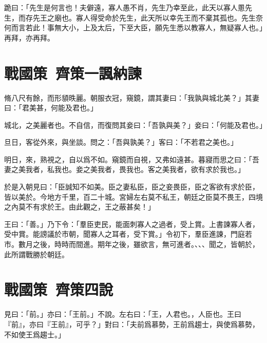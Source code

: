 跪曰：「先生是何言也！夫僻遠，寡人愚不肖，先生乃幸至此，此天以寡人慁先生，而存先王之廟也。寡人得受命於先生，此天所以幸先王而不棄其孤也。先生奈何而言若此！事無大小，上及太后，下至大臣，願先生悉以教寡人，無疑寡人也。」再拜，亦再拜。

\theendnotes

\section[鄒忌諷齊王納諫\quad{\small 戰國策 齊策一}]{{\normalsize 戰國策\ 齊策一}\quad {}諷納諫}
脩八尺有餘，而形䫉昳麗。朝服衣冠，窺鏡，謂其妻曰：「我孰與城北美？」其妻曰：「君美甚，何能及君也。」

城北，之美麗者也。不自信，而復問其妾曰：「吾孰與美？」妾曰：「何能及君也。」

旦日，客從外來，與坐談。問之：「吾與孰美？」客曰：「不若君之美也。」

明日，來，熟視之，自以爲不如。窺鏡而自視，又弗如遠甚。暮寢而思之曰：「吾妻之美我者，私我也。妾之美我者，畏我也。客之美我者，欲有求於我也。」

於是入朝見曰：「臣誠知不如美。臣之妻私臣，臣之妾畏臣，臣之客欲有求於臣，皆以美於。今地方千里，百二十城。宮婦左右莫不私王，朝廷之臣莫不畏王，四境之內莫不有求於王。由此觀之，王之蔽甚矣！」

王曰：「善。」乃下令：「羣臣吏民，能面刺寡人之過者，受上賞。上書諫寡人者，受中賞。能謗議於市朝，聞寡人之耳者，受下賞。」令初下，羣臣進諫，門庭若市。數月之後，時時而間進。期年之後，雖欲言，無可進者。、、、聞之，皆朝於，此所謂戰勝於朝廷。

\section[顏斶說齊王\quad{\small 戰國策\ 齊策四}]{{\normalsize 戰國策\ 齊策四}\quad {}說}
見曰：「前。」亦曰：「王前。」不說。左右曰：「王，人君也。，人臣也。王曰『前』，亦曰『王前』，可乎？」對曰：「夫前爲慕勢，王前爲趨士，與使爲慕勢，不如使王爲趨士。」

